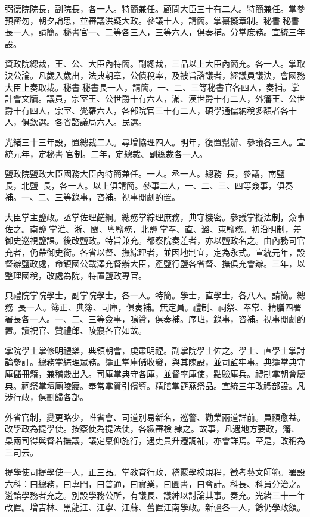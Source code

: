 \begin{pinyinscope}
弼德院院長，副院長，各一人。特簡兼任。顧問大臣三十有二人。特簡兼任。掌參預密勿，朝夕論思，並審議洪疑大政。參議十人，請簡。掌纂擬章制。秘書秘書長一人，請簡。秘書官一、二等各三人，三等六人，俱奏補。分掌庶務。宣統三年設。

資政院總裁，王、公、大臣內特簡。副總裁，三品以上大臣內簡充。各一人。掌取決公論。凡歲入歲出，法典朝章，公債稅率，及被旨諮議者，經議員議決，會國務大臣上奏取裁。秘書秘書長一人，請簡。一、二、三等秘書官各四人，奏補。掌計會文牘。議員，宗室王、公世爵十有六人，滿、漢世爵十有二人，外籓王、公世爵十有四人，宗室、覺羅六人，各部院官三十有二人，碩學通儒納稅多額者各十人，俱欽選。各省諮議局六人。民選。

光緒三十三年設，置總裁二人。尋增協理四人。明年，復置幫辦、參議各三人。宣統元年，定秘書官制。二年，定總裁、副總裁各一人。

鹽政院鹽政大臣國務大臣內特簡兼任。一人。丞一人。總務長，參議，南鹽長，北鹽長，各一人。以上俱請簡。參事二人，一、二、三、四等僉事，俱奏補。一、二、三等錄事，咨補。視事閒劇酌置。

大臣掌主鹽政。丞掌佐理鹺綱。總務掌綜理庶務，典守機密。參議掌擬法制，僉事佐之。南鹽掌淮、浙、閩、粵鹽務，北鹽掌奉、直、潞、東鹽務。初沿明制，差御史巡視鹽課。後改鹽政。特旨兼充。都察院奏差者，亦以鹽政名之。由內務司官充者，仍帶御史銜。各省以督、撫綜理者，並因地制宜，定為永式。宣統元年，設督辦鹽政處，命鎮國公載澤充督辦大臣，產鹽行鹽各省督、撫俱充會辦。三年，以整理國稅，改處為院，特置鹽政專官。

典禮院掌院學士，副掌院學士，各一人。特簡。學士，直學士，各八人。請簡。總務長一人。簿正、典簿、司庫，俱奏補。無定員。禮制、祠祭、奉常、精膳四署署長各一人。一、二、三等僉事，鳴贊，俱奏補。序班，錄事，咨補。視事閒劇酌置。讀祝官、贊禮郎、陵寢各官如故。

掌院學士掌修明禮樂，典領朝會，虔肅明禋。副掌院學士佐之。學士、直學士掌討論參訂。總務掌綜理眾務。簿正掌庫儲收發，與其陳設，並司監牢事。典簿掌典守庫儲冊籍，兼稽覈出入。司庫掌典守各庫，並督率庫使，點驗庫兵。禮制掌朝會慶典。祠祭掌壇廟陵寢。奉常掌贊引儐導。精膳掌筵燕祭品。宣統三年改禮部設。凡涉行政，俱劃歸各部。

外省官制，變更略少，唯省會、司道別易新名，巡警、勸業兩道詳前。員額愈益。改學政為提學使。按察使為提法使，各級審檢隸之。故事，凡遇地方要政，籓、臬兩司得與督若撫議，議定稟仰施行，遇吏員升遷調補，亦會詳焉。至是，改稱為三司云。

提學使司提學使一人，正三品。掌教育行政，稽覈學校規程，徵考藝文師範。署設六科：曰總務，曰專門，曰普通，曰實業，曰圖書，曰會計。科長、科員分治之。遴諳學務者充之。別設學務公所，有議長、議紳以討論其事。奏充。光緒三十一年改置。增吉林、黑龍江、江寧、江蘇、舊置江南學政。新疆各一人，餘仍學政額。


\end{pinyinscope}
